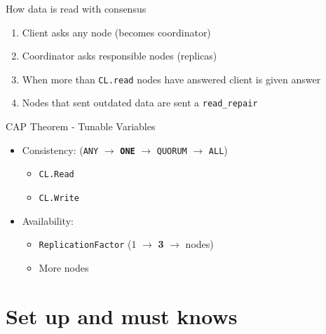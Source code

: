 \documentclass[
  10pt
]{beamer}
\begin{document}
\begin{frame}{How data is read with consensus}
  \begin{enumerate}
    \item<1-> Client asks any node (becomes coordinator)
    \item<2-> Coordinator asks responsible nodes (replicas)
    \item<3-> When more than \lstinline{CL.read} nodes have answered client is given answer
    \item<4-> Nodes that sent outdated data are sent a \lstinline{read_repair}
  \end{enumerate}
\end{frame}

\begin{frame}{CAP Theorem - Tunable Variables}
  \begin{itemize}
    \item<+-> Consistency: (\lstinline{ANY} $\rightarrow$ \textbf{\lstinline{ONE}} $\rightarrow$ \lstinline{QUORUM} $\rightarrow$ \lstinline{ALL})
      \begin{itemize}
        \item \lstinline{CL.Read}
        \item \lstinline{CL.Write}
      \end{itemize}
    \item<+-> Availability:
      \begin{itemize}
        \item \lstinline{ReplicationFactor} (1 $\rightarrow$ \textbf{3} $\rightarrow$ nodes)
        \item More nodes
      \end{itemize}
  \end{itemize}
\end{frame}

\section{Set up and must knows}  %
\end{document}
